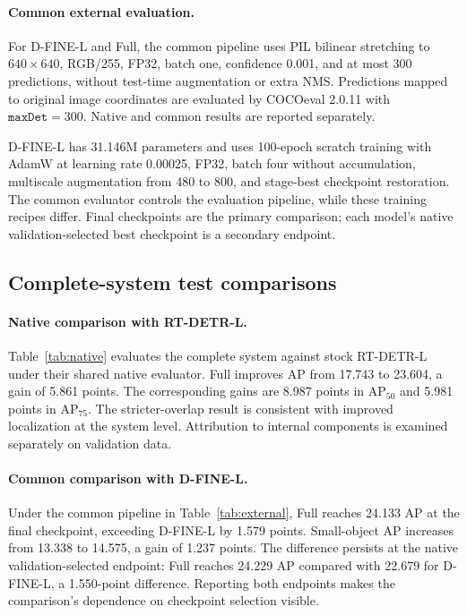 \paragraph{Common external evaluation.}
For D-FINE-L and Full, the common pipeline uses PIL bilinear stretching to $640\times640$, RGB/255, FP32, batch one, confidence 0.001, and at most 300 predictions, without test-time augmentation or extra NMS. Predictions mapped to original image coordinates are evaluated by COCOeval 2.0.11 with $\texttt{maxDet}=300$. Native and common results are reported separately.

D-FINE-L has 31.146M parameters and uses 100-epoch scratch training with AdamW at learning rate 0.00025, FP32, batch four without accumulation, multiscale augmentation from 480 to 800, and stage-best checkpoint restoration. The common evaluator controls the evaluation pipeline, while these training recipes differ. Final checkpoints are the primary comparison; each model's native validation-selected best checkpoint is a secondary endpoint.

\subsection{Complete-system test comparisons}
\paragraph{Native comparison with RT-DETR-L.}
Table~\ref{tab:native} evaluates the complete system against stock RT-DETR-L under their shared native evaluator. Full improves AP from 17.743 to 23.604, a gain of 5.861 points. The corresponding gains are 8.987 points in $\mathrm{AP}_{50}$ and 5.981 points in $\mathrm{AP}_{75}$. The stricter-overlap result is consistent with improved localization at the system level. Attribution to internal components is examined separately on validation data.


\paragraph{Common comparison with D-FINE-L.}
Under the common pipeline in Table~\ref{tab:external}, Full reaches 24.133 AP at the final checkpoint, exceeding D-FINE-L by 1.579 points. Small-object AP increases from 13.338 to 14.575, a gain of 1.237 points. The difference persists at the native validation-selected endpoint: Full reaches 24.229 AP compared with 22.679 for D-FINE-L, a 1.550-point difference. Reporting both endpoints makes the comparison's dependence on checkpoint selection visible.

